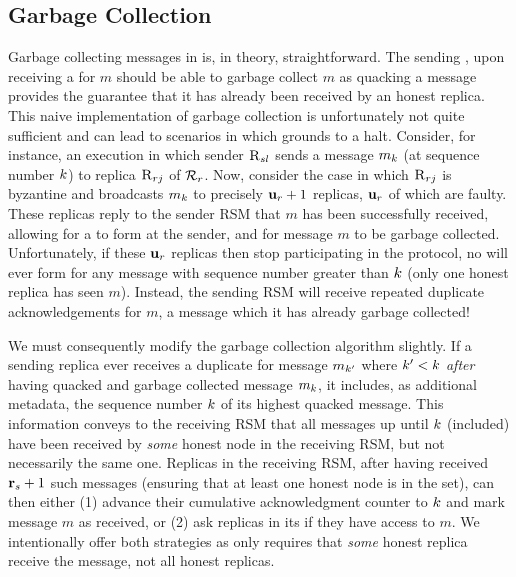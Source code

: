 \subsection{Garbage Collection}
\label{ss:garbage}

Garbage collecting messages in \Scrooge{} is, in theory, straightforward. The sending \RSM{}, upon receiving a \quack{} for $m$ should be able to garbage collect $m$ as quacking a message provides the guarantee that it has already been received by an honest replica.  This naive implementation of garbage collection is unfortunately not quite sufficient and can lead to scenarios in which \Scrooge{} grounds to a halt. Consider, for instance, an execution in which  sender $\textsc{R}_{{s}{l}}$ sends a message $m_k$ (at sequence number $k$) 
to replica $\textsc{R}_{{r}{j}}$ of \RSM{} $\mathcal{R}_{r}$. Now, consider the case in which
$\textsc{R}_{{r}{j}}$ is byzantine and broadcasts $m_k$ to precisely $\textbf{u}_{r}+1$ replicas, $\textbf{u}_{r}$ of which are faulty. These replicas reply to the sender RSM that $m$ has been successfully received, allowing for a \quack{} to form at the sender, and for message $m$ to be garbage collected. Unfortunately, if these $\textbf{u}_{r}$ replicas then stop participating in the protocol, no \quack{} will ever form for any message with sequence number greater than $k$ (only one honest replica has seen $m$). Instead, the sending RSM will receive repeated duplicate acknowledgements for $m$, a message which it has already garbage collected!

We must consequently modify the garbage collection algorithm slightly. If a sending replica ever receives a duplicate \quack{} for message $m_{k'}$ where $k'<k$ \textit{after} having quacked and garbage collected message $m_k$, it includes, as additional metadata, the sequence number $k$ of its highest quacked message. This information conveys to the receiving RSM that all messages up until $k$ (included) have been received by \textit{some} honest node in the receiving RSM, but not necessarily the same one. Replicas in the receiving RSM, after having received $\textbf{r}_{s}+1$ such messages (ensuring that at least one honest node is in the set), can then either (1) advance their cumulative acknowledgment counter to $k$ and mark message $m$ as received, or (2) ask replicas in its \RSM{} if they have access to $m$. We intentionally offer both strategies as \CCC{} only requires that \textit{some} honest replica receive the message, not all honest replicas.

